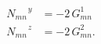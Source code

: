 \begin{equation}
\begin{aligned}
N_{m n}^{\;\;\;\;\;\; y} &=  -2\,G^1_{mn} \\
N_{m n}^{\;\;\;\;\;\; z} &=  -2\,G^2_{mn} .
\end{aligned}
\end{equation}

